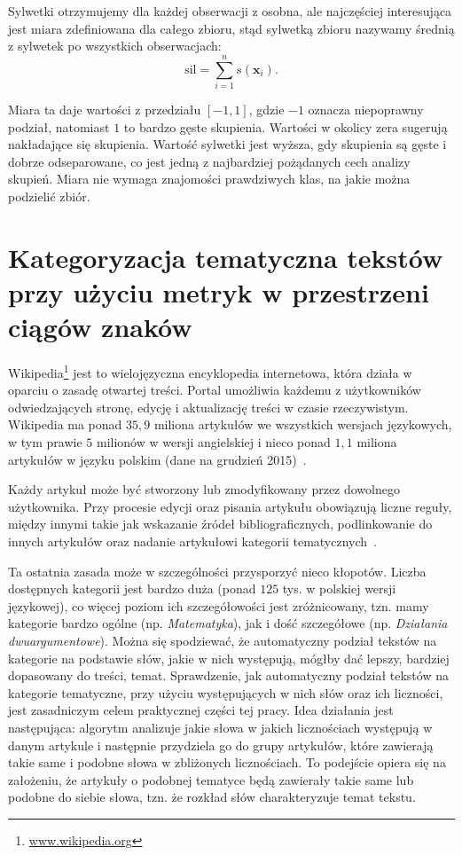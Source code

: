 \documentclass{praca1}
\begin{document}
Sylwetki otrzymujemy dla każdej obserwacji z osobna, ale najczęściej interesująca jest miara zdefiniowana dla całego zbioru, stąd sylwetką zbioru nazywamy średnią z sylwetek po wszystkich obserwacjach:
\begin{equation*}
\mathrm{sil} = \sum\limits_{i=1}^{n}s(\mathbf{x}_i).
\end{equation*}

Miara ta daje wartości z przedziału $[-1, 1]$, gdzie $-1$ oznacza niepoprawny podział, natomiast $1$ to bardzo gęste skupienia. Wartości w okolicy zera sugerują nakładające się skupienia. Wartość sylwetki jest wyższa, gdy skupienia są gęste i dobrze odseparowane, co jest jedną z najbardziej pożądanych cech analizy skupień. Miara nie wymaga znajomości prawdziwych klas, na jakie można podzielić zbiór.



\chapter{Kategoryzacja tematyczna tekstów przy użyciu metryk w przestrzeni ciągów znaków}

Wikipedia\footnote{\url{www.wikipedia.org}} jest to wielojęzyczna encyklopedia internetowa, która działa w oparciu o zasadę otwartej treści. Portal umożliwia każdemu z użytkowników odwiedzających stronę, edycję i aktualizację treści w czasie rzeczywistym. Wikipedia ma ponad $35,9$ miliona artykułów we wszystkich wersjach językowych, w tym prawie $5$ milionów w wersji angielskiej i nieco ponad $1,1$ miliona artykułów w języku polskim (dane na grudzień 2015)~\cite{wiki}.

Każdy artykuł może być stworzony lub zmodyfikowany przez dowolnego użytkownika. Przy procesie edycji oraz pisania artykułu obowiązują liczne reguły, między innymi takie jak wskazanie źródeł bibliograficznych, podlinkowanie do innych artykułów oraz nadanie artykułowi kategorii tematycznych~\cite{wiki}. 

Ta ostatnia zasada może w szczególności przysporzyć nieco kłopotów. Liczba dostępnych kategorii jest bardzo duża (ponad $125$ tys. w polskiej wersji językowej), co więcej poziom ich szczegółowości jest zróżnicowany, tzn. mamy kategorie bardzo ogólne (np. \emph{Matematyka}), jak i dość szczegółowe (np. \emph{Działania dwuargumentowe}). Można się spodziewać, że automatyczny podział tekstów na kategorie na podstawie słów, jakie w nich występują, mógłby dać lepszy, bardziej dopasowany do treści, temat. Sprawdzenie, jak automatyczny podział tekstów na kategorie tematyczne, przy użyciu występujących w nich słów oraz ich liczności, jest zasadniczym celem praktycznej części tej pracy. Idea działania jest następująca: algorytm analizuje jakie słowa w jakich licznościach występują w danym artykule i następnie przydziela go do grupy artykułów, które zawierają takie same i podobne słowa w zbliżonych licznościach. To podejście opiera się na założeniu, że artykuły o podobnej tematyce będą zawierały takie same lub podobne do siebie słowa, tzn. że rozkład słów charakteryzuje temat tekstu.
\end{document}
